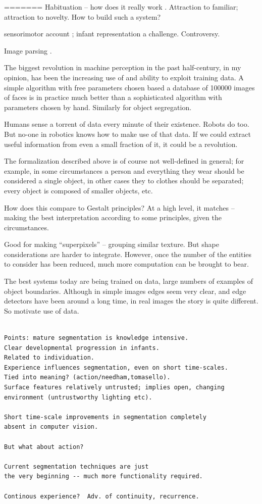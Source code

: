 =======
Habituation -- how does it really work \cite{sirois02models}.
Attraction to familiar; attraction to novelty.
How to build such a system?

sensorimotor account \cite{oregan01sensorimotor};
infant representation a challenge.  Controversy.

Image parsing \cite{tu05image}.





The biggest revolution in machine perception in the past half-century, 
in my opinion, has been the increasing use of and ability to exploit 
training data.  A simple algorithm with free parameters chosen based a 
database of 100000 images of faces is in practice much better than a 
sophisticated algorithm with parameters chosen by hand.  Similarly for 
object segregation.

Humans sense a torrent of data every minute of their existence.  Robots 
do too.  But no-one in robotics knows how to make use of that data.  If 
we could extract useful information from even a small fraction of it, it 
could be a revolution.




The formalization described above is of course
not well-defined in general; for example, in some
circumstances a person and everything they wear should be
considered a single object, in other cases they to clothes
should be separated; every object is composed of smaller
objects, etc.  

How does this compare to Gestalt principles?  At a high level, it
matches -- making the best interpretation according to some
principles, given the circumstances.

Good for making ``superpixels'' -- grouping similar texture.
But shape considerations are harder to integrate.  However,
once the number of the entities to consider has been 
reduced, much more computation can be brought to bear.

The best systems today are being trained on data, large numbers
of examples of object boundaries.  Although in simple images
edges seem very clear, and edge detectors have been around
a long time, in real images the story is quite different.
So motivate use of data.




\begin{verbatim}

Points: mature segmentation is knowledge intensive.
Clear developmental progression in infants.
Related to individuation.
Experience influences segmentation, even on short time-scales.
Tied into meaning? (action/needham,tomasello).
Surface features relatively untrusted; implies open, changing 
environment (untrustworthy lighting etc).

Short time-scale improvements in segmentation completely
absent in computer vision.

But what about action?

Current segmentation techniques are just
the very beginning -- much more functionality required.

Continous experience?  Adv. of continuity, recurrence.

\end{verbatim}


